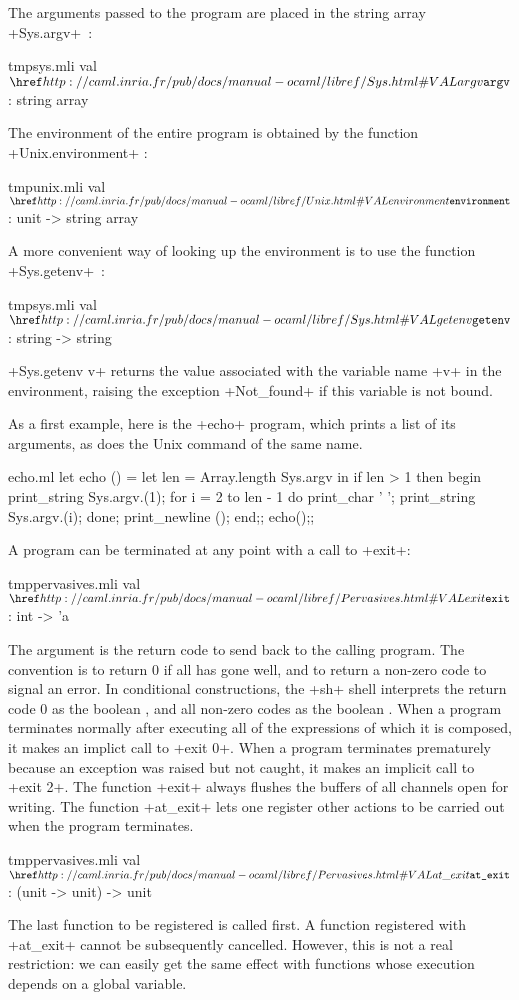The arguments passed to the program are placed in the string array
\ml+Sys.argv+~:
%
\begin{listingcodefile}{tmpsys.mli}
val $\indexlibvalue{Sys}{argv}$ : string array
\end{listingcodefile}
%
The environment of the entire program is obtained by the function
\ml+Unix.environment+ :
%
\begin{listingcodefile}{tmpunix.mli}
val $\indexlibvalue{Unix}{environment}$ : unit -> string array
\end{listingcodefile}
%
A more convenient way of looking up the environment is to use the
function \ml+Sys.getenv+~:
%
\begin{listingcodefile}{tmpsys.mli}
val $\indexlibvalue{Sys}{getenv}$ : string -> string
\end{listingcodefile}
%
\ml+Sys.getenv v+ returns the value associated with the variable name
\ml+v+ in 
the environment, raising the exception  \ml+Not_found+ if this 
variable is not bound.
%
\begin{example}
As a first example, here is the \ml+echo+ program, which prints a
list of its arguments, as does the Unix command of the same name.
\begin{listingcodefile}{echo.ml}
let echo () = 
  let len = Array.length Sys.argv in
  if len > 1 then 
    begin
      print_string Sys.argv.(1); 
      for i = 2 to len - 1 do 
        print_char ' ';
        print_string Sys.argv.(i); 
      done;
      print_newline ();
    end;;
echo();;
\end{listingcodefile}
\end{example}

A program can be terminated at any point with a call to \ml+exit+:
%
\begin{listingcodefile}{tmppervasives.mli}
val $\indexlibvalue{Pervasives}{exit}$ : int -> 'a
\end{listingcodefile}
%
The argument is the return code to send back to the calling program. The
convention is to return 0 if all has gone well, and to return a
non-zero code to signal an error. In conditional constructions, the
\ml+sh+ shell interprets the return code 0 as the boolean
, and all non-zero codes as the boolean .
%
When a program terminates normally after executing all of the
expressions of which it is composed, it makes an implict call to
\ml+exit 0+. When a program terminates prematurely because an
exception was raised but not caught, it makes an implicit call to
\ml+exit 2+.
%
The function \ml+exit+ always flushes the buffers of all channels open for
writing. The function \ml+at_exit+ lets one register other actions
to be carried out when the program terminates.
%
\begin{listingcodefile}{tmppervasives.mli}
val $\indexlibvalue{Pervasives}{at\_exit}$ : (unit -> unit) -> unit
\end{listingcodefile}
%
The last function to be registered is called first. A function registered with
\ml+at_exit+ cannot be subsequently cancelled. However, this is not a
real restriction: we can easily get the same effect with functions
whose execution depends on a global variable.

